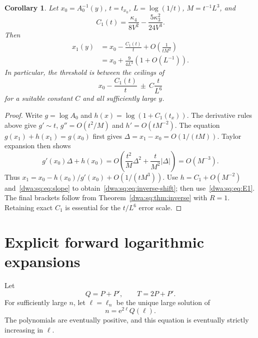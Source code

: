 \documentclass[11pt,letterpaper]{article}
\numberwithin{equation}{section}
\newtheorem{corollary}[theorem]{Corollary}
\theoremstyle{remark}
\newcommand{\e}{\mathrm e}
\begin{document}
\begin{corollary}\label{dwa:sq:cor:inverse-shift}
Let $x_0=A_0^{-1}(y)$, $t=t_{x_0}$, $L=\log(1/t)$, $M=t^{-1}L^3$, and
\[
 C_1(t)=\frac{\kappa_4}{8V^2}-\frac{5\kappa_3^2}{24V^3}.
\]
Then
\begin{align}
 x_1(y)&=x_0-\frac{C_1(t)}t+O\left(\frac1{tM^2}\right)\label{dwa:sq:eq:inverse-shift}\\
 &=x_0+\frac9{4L^3}\left(1+O(L^{-1})\right).\nonumber
\end{align}
In particular, the threshold is between the ceilings of
\[
 x_0-\frac{C_1(t)}t\ \pm\ C\frac{t}{L^6}
\]
for a suitable constant $C$ and all sufficiently large $y$.
\end{corollary}
\begin{proof}
Write $g=\log A_0$ and $h(x)=\log(1+C_1(t_x))$. The derivative rules above give $g'\sim t$, $g''=O(t^2/M)$ and $h'=O(tM^{-2})$. The equation $g(x_1)+h(x_1)=g(x_0)$ first gives $\Delta=x_1-x_0=O(1/(tM))$. Taylor expansion then shows
\[
 g'(x_0)\Delta+h(x_0)
 =O\left(\frac{t^2}{M}\Delta^2+\frac{t}{M^2}|\Delta|\right)
 =O(M^{-3}).
\]
Thus $x_1=x_0-h(x_0)/g'(x_0)+O(1/(tM^3))$. Use $h=C_1+O(M^{-2})$ and~\eqref{dwa:sq:eq:slope} to obtain~\eqref{dwa:sq:eq:inverse-shift}; then use~\eqref{dwa:sq:eq:E1}. The final brackets follow from Theorem~\ref{dwa:sq:thm:inverse} with $R=1$. Retaining exact $C_1$ is essential for the $t/L^6$ error scale.
\end{proof}

\section{Explicit forward logarithmic expansions}
Let
\begin{equation}\label{dwa:sq:eq:QT}
 Q=P+P',\qquad T=2P+P'.
\end{equation}
For sufficiently large $n$, let $\ell=\ell_n$ be the unique large solution of
\begin{equation}\label{dwa:sq:eq:model-saddle}
 n=\e^{2\ell}Q(\ell).
\end{equation}
The polynomials are eventually positive, and this equation is eventually strictly increasing in $\ell$.
\end{document}
